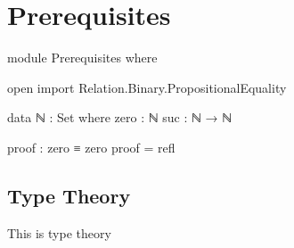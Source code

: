 \chapter{Prerequisites}

\begin{code}
module Prerequisites where

open import Relation.Binary.PropositionalEquality

data ℕ : Set where
  zero : ℕ
  suc  : ℕ → ℕ

proof : zero ≡ zero
proof = refl
\end{code}

\section{Type Theory}

This is type theory
